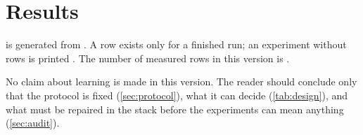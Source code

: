 
\section{Results}\label{sec:results}

 is generated from . A row exists only for a
finished run; an experiment without rows is printed \notrun. The number of measured rows in
this version is \measuredrows.

\begin{table}[t]
\centering\small

\caption{Paired outcomes over exam-family clusters (wins: adapter resolves more of the
family than base; losses: fewer), with the exact one-sided sign test.}\label{tab:results}
\end{table}

No claim about learning is made in this version. The reader should conclude only that
the protocol is fixed (\cref{sec:protocol}), what it can decide (\cref{tab:design}),
and what must be repaired in the stack before the experiments can mean anything
(\cref{sec:audit}).
